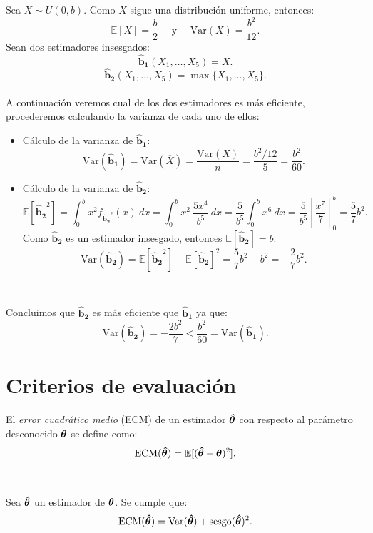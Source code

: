 \documentclass[oneside,openright,titlepage,numbers=noenddot,openany,headinclude,footinclude=true,
cleardoublepage=empty,abstractoff,BCOR=5mm,paper=a4,fontsize=12pt,main=spanish]{scrreprt}
\begin{document}
\begin{example} \label{ex:eficienciaex}
Sea $X \sim U(0,b)$.
Como $X$ sigue una distribución uniforme, entonces: $$\mathbb{E}[X]=\frac{b}{2} \quad \text{ y } \quad \text{Var}(X)=\frac{b^2}{12}.$$
Sean dos estimadores insesgados:
$$\bm{\hat{b}_1}(X_1,\dots,X_{5})=\overline{X}.$$
$$\bm{\hat{b}_2}(X_1,\dots,X_{5})=\max \{X_1,\dots,X_5\}.$$\\
A continuación veremos cual de los dos estimadores es más eficiente, procederemos calculando la varianza de cada uno de ellos:\\

\begin{itemize}
    \item Cálculo de la varianza de $\bm{\hat{b}_1}$: $$\text{Var}(\bm{\hat{b}_1})=\text{Var}(\overline{X})=\frac{\text{Var}(X)}{n}=\frac{b^2/12}{5}=\frac{b^2}{60}.$$
    \item Cálculo de la varianza de $\bm{\hat{b}_2}$: $$\mathbb{E}\left[\bm{\hat{b}_2}^2\right]=\int_{0}^b x^2 f_{\bm{\hat{b}_2}^2}(x) \ dx=\int_{0}^b x^2 \ \frac{5x^4}{b^5} \ dx=\frac{5}{b^5}\int_{0}^b x^6 \ dx=\frac{5}{b^5}\left[\frac{x^7}{7}\right]_{0}^b=\frac{5}{7}b^2.$$
    Como $\bm{\hat{b}_2}$ es un estimador insesgado, entonces $\mathbb{E}[\bm{\hat{b}_2}]=b$.
    $$\text{Var}\left(\bm{\hat{b}_2}\right)=\mathbb{E}\left[\bm{\hat{b}_2}^2\right]-\mathbb{E}\left[\bm{\hat{b}_2}\right]^2=\frac{5}{7}b^2-b^2=-\frac{2}{7}b^2.$$
\end{itemize}\

Concluimos que $\bm{\hat{b}_2}$ es más eficiente que $\bm{\hat{b}_1}$ ya que: $$\text{Var}(\bm{\hat{b}_2})= -\frac{2b^2}{7} < \frac{b^2}{60}=\text{Var}(\bm{\hat{b}_1}).$$
\end{example}

\clearpage

\section{Criterios de evaluación}

\begin{definition}
El \textit{error cuadrático medio} (ECM) de un estimador $\bm{\hat{\theta}}$ con respecto al parámetro desconocido $\bm{\theta}$  se define como: $$\text{ECM}(\bm{\hat{\theta}})=\mathbb{E}[(\bm{\hat{\theta}}-\bm{\theta})^2].$$
\end{definition}\

\begin{proposition}
Sea $\bm{\hat{\theta}}$ un estimador de $\bm{\theta}$. Se cumple que:
$$\text{ECM}(\bm{\hat{\theta}})=\text{Var}(\bm{\hat{\theta}})+\text{sesgo}(\bm{\hat{\theta}})^2.$$
\end{proposition}
\end{document}
